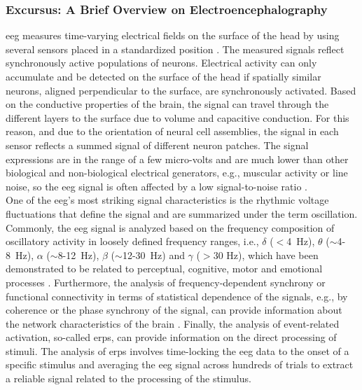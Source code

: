 \begin{tcolorbox}
    \subsubsection{Excursus: A Brief Overview on Electroencephalography}
    \Gls{eeg} measures time-varying electrical fields on the surface of the head by using several sensors placed in a standardized position \cite{Jackson2014}. The measured signals reflect synchronously active populations of neurons. Electrical activity can only accumulate and be detected on the surface of the head if spatially similar neurons, aligned perpendicular to the surface, are synchronously activated. Based on the conductive properties of the brain, the signal can travel through the different layers to the surface due to volume and capacitive conduction. For this reason, and due to the orientation of neural cell assemblies, the signal in each sensor reflects a summed signal of different neuron patches. The signal expressions are in the range of a few micro-volts and are much lower than other biological and non-biological electrical generators, e.g., muscular activity or line noise, so the \gls{eeg} signal is often affected by a low signal-to-noise ratio \cite{CohenX2017}.\\
    One of the \gls{eeg}'s most striking signal characteristics is the rhythmic voltage fluctuations that define the signal and are summarized under the term oscillation. Commonly, the \gls{eeg} signal is analyzed based on the frequency composition of oscillatory activity in loosely defined frequency ranges, i.e., $\delta$ ($<$4~Hz), $\theta$ ($\sim$4-8~Hz), $\alpha$ ($\sim$8-12~Hz), $\beta$ ($\sim$12-30~Hz) and $\gamma$ ($>$30 Hz), which have been demonstrated to be related to perceptual, cognitive, motor and emotional processes \cite{CohenX2017}. Furthermore, the analysis of frequency-dependent synchrony or functional connectivity in terms of statistical dependence of the signals, e.g., by coherence or the phase synchrony of the signal, can provide information about the network characteristics of the brain \cite{Siegel2012}. Finally, the analysis of event-related activation, so-called \glspl{erp}, can provide information on the direct processing of stimuli. The analysis of \glspl{erp} involves time-locking the \gls{eeg} data to the onset of a specific stimulus and averaging the \gls{eeg} signal across hundreds of trials to extract a reliable signal related to the processing of the stimulus.
\end{tcolorbox}

